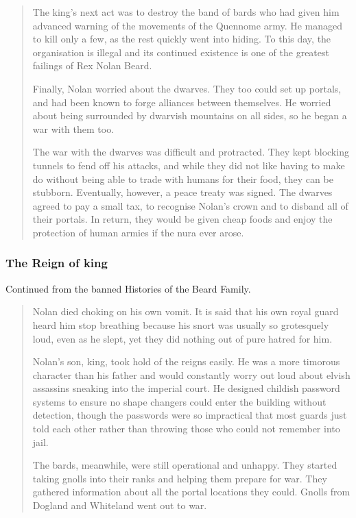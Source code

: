 \begin{multicols}{2}
\begin{quotation}
	The king's next act was to destroy the band of bards who had given him advanced warning of the movements of the Quennome army.
	He managed to kill only a few, as the rest quickly went into hiding.
	To this day, the organisation is illegal and its continued existence is one of the greatest failings of Rex Nolan Beard.

	Finally, Nolan worried about the dwarves.
	They too could set up portals, and had been known to forge alliances between themselves.
	He worried about being surrounded by dwarvish mountains on all sides, so he began a war with them too.

	The war with the dwarves was difficult and protracted.
	They kept blocking tunnels to fend off his attacks, and while they did not like having to make do without being able to trade with humans for their food, they can be stubborn.
	Eventually, however, a peace treaty was signed.
	The dwarves agreed to pay a small tax, to recognise Nolan's crown and to disband all of their portals.
	In return, they would be given cheap foods and enjoy the protection of human armies if the nura ever arose.

\end{quotation}


\subsubsection{The Reign of \gls{king}}

Continued from the banned Histories of the Beard Family.

\begin{quotation}

	Nolan died choking on his own vomit.
	It is said that his own royal guard heard him stop breathing because his snort was usually so grotesquely loud, even as he slept, yet they did nothing out of pure hatred for him.

	Nolan's son, \gls{king}, took hold of the reigns easily.
	He was a more timorous character than his father and would constantly worry out loud about elvish assassins sneaking into the imperial court.
	He designed childish password systems to ensure no shape changers could enter the building without detection, though the passwords were so impractical that most guards just told each other rather than throwing those who could not remember into jail.

	The bards, meanwhile, were still operational and unhappy.
	They started taking gnolls into their ranks and helping them prepare for war.
	They gathered information about all the portal locations they could.
	Gnolls from Dogland and Whiteland went out to war.


\end{quotation}
\end{multicols}
